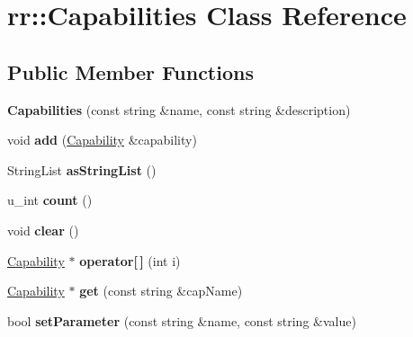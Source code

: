 \hypertarget{classrr_1_1_capabilities}{\section{rr\-:\-:Capabilities Class Reference}
\label{classrr_1_1_capabilities}
}
\subsection*{Public Member Functions}
\begin{DoxyCompactItemize}
\item 
\hypertarget{classrr_1_1_capabilities_ae06544c2a2638bee35190d5f7ab9d91f}{{\bfseries Capabilities} (const string \&name, const string \&description)}\label{classrr_1_1_capabilities_ae06544c2a2638bee35190d5f7ab9d91f}

\item 
\hypertarget{classrr_1_1_capabilities_a4957b1a4e078ac3fd8ff8434a3647be7}{void {\bfseries add} (\hyperlink{classrr_1_1_capability}{Capability} \&capability)}\label{classrr_1_1_capabilities_a4957b1a4e078ac3fd8ff8434a3647be7}

\item 
\hypertarget{classrr_1_1_capabilities_a7b013a0ba134b8d9c3a2710b9b1eda7c}{String\-List {\bfseries as\-String\-List} ()}\label{classrr_1_1_capabilities_a7b013a0ba134b8d9c3a2710b9b1eda7c}

\item 
\hypertarget{classrr_1_1_capabilities_a9c489b5de396d333b5eb54d7fb9b6d44}{u\-\_\-int {\bfseries count} ()}\label{classrr_1_1_capabilities_a9c489b5de396d333b5eb54d7fb9b6d44}

\item 
\hypertarget{classrr_1_1_capabilities_a226463b3bd3ae2b0f1f8d0029fc9b6bf}{void {\bfseries clear} ()}\label{classrr_1_1_capabilities_a226463b3bd3ae2b0f1f8d0029fc9b6bf}

\item 
\hypertarget{classrr_1_1_capabilities_a5bef4713306b3a43e6c8ed42c0b098ef}{\hyperlink{classrr_1_1_capability}{Capability} $\ast$ {\bfseries operator\mbox{[}$\,$\mbox{]}} (int i)}\label{classrr_1_1_capabilities_a5bef4713306b3a43e6c8ed42c0b098ef}

\item 
\hypertarget{classrr_1_1_capabilities_ab2409d7f4b651709a1e37fc1dfd89725}{\hyperlink{classrr_1_1_capability}{Capability} $\ast$ {\bfseries get} (const string \&cap\-Name)}\label{classrr_1_1_capabilities_ab2409d7f4b651709a1e37fc1dfd89725}

\item 
\hypertarget{classrr_1_1_capabilities_a1a7b112bb787a1b93ee7c6012bc5bf3f}{bool {\bfseries set\-Parameter} (const string \&name, const string \&value)}\label{classrr_1_1_capabilities_a1a7b112bb787a1b93ee7c6012bc5bf3f}

\end{DoxyCompactItemize}
